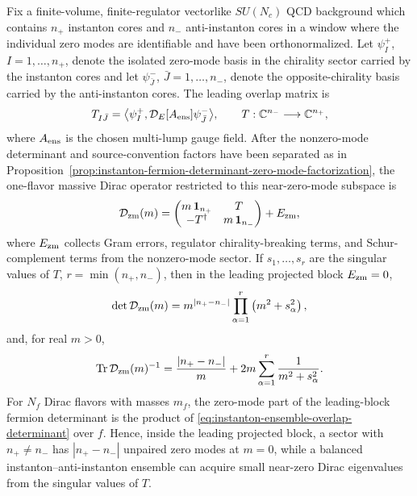 \begin{proposition}
\label{prop:instanton-ensemble-zero-mode-overlap}
Fix a finite-volume, finite-regulator vectorlike \(SU(N_c)\) QCD background
which contains \(n_+\) instanton cores and \(n_-\) anti-instanton cores in a
window where the individual zero modes are identifiable and have been
orthonormalized.  Let \(\psi_I^+\), \(I=1,\ldots,n_+\), denote the isolated
zero-mode basis in the chirality sector carried by the instanton cores and let
\(\psi_{\bar J}^-\), \(\bar J=1,\ldots,n_-\), denote the opposite-chirality
basis carried by the anti-instanton cores.  The leading overlap matrix is
\begin{equation}
  T_{I\bar J}
  =
  \bigl\langle
    \psi_I^+,\mathcal D_E[A_{\rm ens}]\psi_{\bar J}^-
  \bigr\rangle ,
  \qquad
  T:\mathbb C^{n_-}\longrightarrow\mathbb C^{n_+},
  \label{eq:instanton-ensemble-overlap-matrix}
\end{equation}
where \(A_{\rm ens}\) is the chosen multi-lump gauge field.  After the
nonzero-mode determinant and source-convention factors have been separated as
in Proposition~\ref{prop:instanton-fermion-determinant-zero-mode-factorization},
the one-flavor massive Dirac operator restricted to this near-zero-mode
subspace is
\begin{equation}
  \mathcal D_{\rm zm}(m)
  =
  \begin{pmatrix}
    m\,\mathbf 1_{n_+} & T\\
    -T^\dagger & m\,\mathbf 1_{n_-}
  \end{pmatrix}
  +E_{\rm zm},
  \label{eq:instanton-ensemble-zero-mode-block}
\end{equation}
where \(E_{\rm zm}\) collects Gram errors, regulator chirality-breaking terms,
and Schur-complement terms from the nonzero-mode sector.  If
\(s_1,\ldots,s_r\) are the singular values of \(T\),
\(r=\min(n_+,n_-)\), then in the leading projected block
\(E_{\rm zm}=0\),
\begin{equation}
  \det\mathcal D_{\rm zm}(m)
  =
  m^{|n_+-n_-|}
  \prod_{\alpha=1}^{r}\left(m^2+s_\alpha^2\right),
  \label{eq:instanton-ensemble-overlap-determinant}
\end{equation}
and, for real \(m>0\),
\begin{equation}
  \operatorname{Tr}\mathcal D_{\rm zm}(m)^{-1}
  =
  \frac{|n_+-n_-|}{m}
  +
  2m\sum_{\alpha=1}^{r}\frac1{m^2+s_\alpha^2}.
  \label{eq:instanton-ensemble-overlap-resolvent}
\end{equation}
For \(N_f\) Dirac flavors with masses \(m_f\), the zero-mode part of the
leading-block fermion determinant is the product of
\eqref{eq:instanton-ensemble-overlap-determinant} over \(f\).  Hence, inside
the leading projected block, a sector with \(n_+\ne n_-\) has
\(|n_+-n_-|\) unpaired zero modes at \(m=0\), while a balanced
instanton--anti-instanton ensemble can acquire small near-zero Dirac
eigenvalues from the singular values of \(T\).


\end{proposition}
